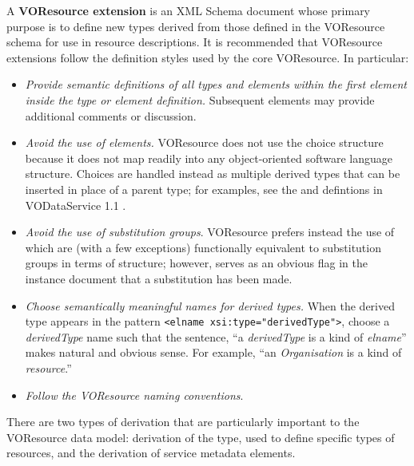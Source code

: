 \documentclass[11pt,a4paper]{ivoa}
\begin{document}
A \textbf{VOResource extension} is an XML Schema document whose primary
purpose is to define new types derived from those defined in the
VOResource schema for use in resource descriptions.  It is recommended
that VOResource extensions follow the definition styles used by the core
VOResource.  In particular: 

\begin{itemize}
  \item \emph{Provide semantic definitions of all types and elements within
       the first  element inside
       the type or element definition.}  Subsequent
        elements may provide
       additional comments or discussion.  

  \item \emph{Avoid the use of  elements.}
       VOResource does not use the choice structure because it does
       not map readily into any object-oriented software language
       structure.  Choices are handled instead as multiple derived
       types that can be inserted in place of a parent type; for
       examples, see the  and
        defintions in VODataService 1.1
       \citep{2010ivoa.spec.1202P}.

  \item \emph{Avoid the use of substitution groups}.  VOResource
       prefers instead the use of  which are
       (with a few exceptions) functionally equivalent to substitution
       groups in terms of structure; however, 
       serves as an obvious flag in the instance document that a
       substitution has been made. 

  \item \emph{Choose semantically meaningful names for derived
       types.}  When the derived type appears in the pattern
       \verb|<elname xsi:type="derivedType">|,
       choose a \textit{derivedType} name such that the sentence, ``a
       \textit{derivedType} is a kind of \textit{elname}'' makes natural
       and obvious sense.  For example, ``an \textit{Organisation} is a
       kind of \textit{resource}.'' 

  \item \emph{Follow the VOResource naming conventions}. 
\end{itemize}



There are two types of derivation that are particularly important to
the VOResource data model:  derivation of the 
type, used to define specific types of resources, and the derivation
of service metadata elements.  
\end{document}
